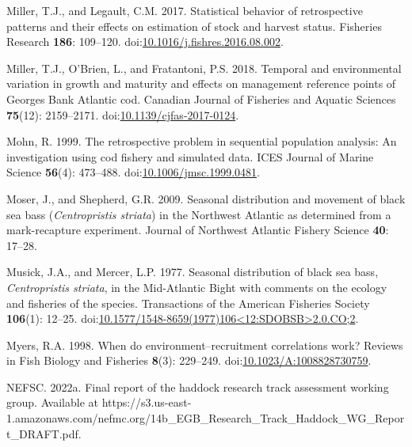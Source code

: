 \documentclass[
]{article}
\newlength{\cslhangindent}
\newlength{\cslentryspacingunit} %
\newenvironment{CSLReferences}[2] %
 {%
  \setlength{\parindent}{0pt}
  \ifodd #1
  \let\oldpar\par
  \def\par{\hangindent=\cslhangindent\oldpar}
  \fi
  \setlength{\parskip}{#2\cslentryspacingunit}
 }%
 {}
\begin{document}
\begin{CSLReferences}{1}{0}
\leavevmode{}%
Miller, T.J., and Legault, C.M. 2017. Statistical behavior of retrospective patterns and their effects on estimation of stock and harvest status. Fisheries Research \textbf{186}: 109--120. doi:\href{https://doi.org/10.1016/j.fishres.2016.08.002}{10.1016/j.fishres.2016.08.002}.

\leavevmode{}%
Miller, T.J., O'Brien, L., and Fratantoni, P.S. 2018. Temporal and environmental variation in growth and maturity and effects on management reference points of {Georges Bank Atlantic} cod. Canadian Journal of Fisheries and Aquatic Sciences \textbf{75}(12): 2159--2171. doi:\href{https://doi.org/10.1139/cjfas-2017-0124}{10.1139/cjfas-2017-0124}.

\leavevmode{}%
Mohn, R. 1999. The retrospective problem in sequential population analysis: An investigation using cod fishery and simulated data. ICES Journal of Marine Science \textbf{56}(4): 473--488. doi:\href{https://doi.org/10.1006/jmsc.1999.0481}{10.1006/jmsc.1999.0481}.

\leavevmode{}%
Moser, J., and Shepherd, G.R. 2009. Seasonal distribution and movement of black sea bass (\emph{{C}entropristis striata}) in the {N}orthwest {A}tlantic as determined from a mark-recapture experiment. Journal of Northwest Atlantic Fishery Science \textbf{40}: 17--28.

\leavevmode{}%
Musick, J.A., and Mercer, L.P. 1977. Seasonal distribution of black sea bass, \emph{{C}entropristis striata}, in the {M}id-{A}tlantic {B}ight with comments on the ecology and fisheries of the species. Transactions of the American Fisheries Society \textbf{106}(1): 12--25. doi:\href{https://doi.org/10.1577/1548-8659(1977)106\%3C12:SDOBSB\%3E2.0.CO;2}{10.1577/1548-8659(1977)106\textless12:SDOBSB\textgreater2.0.CO;2}.

\leavevmode{}%
Myers, R.A. 1998. When do environment--recruitment correlations work? Reviews in Fish Biology and Fisheries \textbf{8}(3): 229--249. doi:\href{https://doi.org/10.1023/A:1008828730759}{10.1023/A:1008828730759}.

\leavevmode{}%
NEFSC. 2022a. Final report of the haddock research track assessment working group. {Available} at https://s3.us-east-1.amazonaws.com/nefmc.org/14b\_EGB\_Research\_Track\_Haddock\_WG\_Report\_DRAFT.pdf.


\end{CSLReferences}
\end{document}
